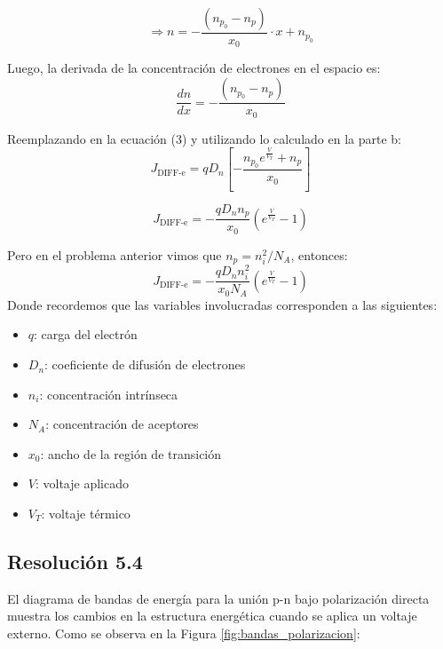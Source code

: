 \documentclass[
  11pt,
  letterpaper,
   addpoints,
  ]{exam}
\begin{document}
\begin{questions}
\begin{solution}
    \begin{equation}
        \Rightarrow n = -\frac{(n_{p_0} - n_p)}{x_0} \cdot x + n_{p_0}
    \end{equation}

    Luego, la derivada de la concentración de electrones en el espacio es:
    \begin{equation}
        \frac{dn}{dx} = -\frac{(n_{p_0} - n_p)}{x_0}
    \end{equation}

    Reemplazando en la ecuación (3) y utilizando lo calculado en la parte b:
    \begin{equation}
        J_{\text{DIFF-e}} = qD_n\left[-\frac{n_{p_0}e^{\frac{V}{V_T}} + n_p}{x_0}\right]
    \end{equation}

    \begin{equation}
        J_{\text{DIFF-e}} = -\frac{qD_nn_p}{x_0}\left(e^{\frac{V}{V_T}} - 1\right)
    \end{equation}

    Pero en el problema anterior vimos que $n_p = n_i^2/N_A$, entonces:
    \begin{equation}
        J_{\text{DIFF-e}} = -\frac{qD_nn_i^2}{x_0N_A}\left(e^{\frac{V}{V_T}} - 1\right)
    \end{equation}
    Donde recordemos que las variables involucradas corresponden a las siguientes:
    \begin{itemize}
        \item $q$: carga del electrón
        \item $D_n$: coeficiente de difusión de electrones
        \item $n_i$: concentración intrínseca
        \item $N_A$: concentración de aceptores
        \item $x_0$: ancho de la región de transición
        \item $V$: voltaje aplicado
        \item $V_T$: voltaje térmico
    \end{itemize}

    \subsection*{Resolución 5.4}
    
    El diagrama de bandas de energía para la unión p-n bajo polarización directa muestra los cambios en la estructura energética cuando se aplica un voltaje externo. Como se observa en la Figura \ref{fig:bandas_polarizacion}:


\end{solution}
\end{questions}
\end{document}
